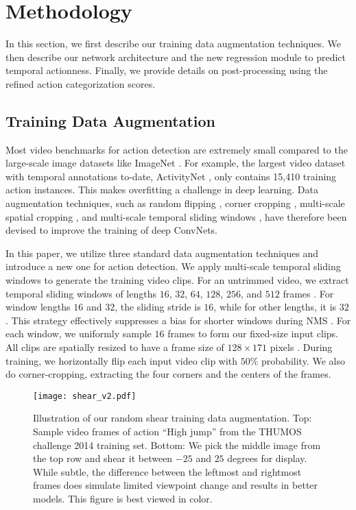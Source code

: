 \documentclass[10pt,twocolumn,letterpaper]{article}
\begin{document}
\section{Methodology}
\label{sec:methodology}
In this section, we first describe our training data augmentation techniques. We then describe our network architecture and the new regression module to predict temporal actionness. Finally, we provide details on post-processing using the refined action categorization scores.

\subsection{Training Data Augmentation}
Most video benchmarks for action detection are extremely small compared to the large-scale image datasets like ImageNet \cite{imagenet_cvpr09}. For example, the largest video dataset with temporal annotations to-date, ActivityNet \cite{activityNet}, only contains 15,410 training action instances. This makes overfitting a challenge in deep learning. Data augmentation techniques, such as random flipping \cite{imagenet_deep_learning_nips12_alex}, corner cropping \cite{wanggoodpractice2015}, multi-scale spatial cropping \cite{sppnet,twostream2014}, and multi-scale temporal sliding windows \cite{scnn_shou_wang_chang_cvpr16}, have therefore been devised to improve the training of deep ConvNets.

In this paper, we utilize three standard data augmentation techniques and introduce a new one for action detection.
We apply multi-scale temporal sliding windows to generate the training video clips. For an untrimmed video, we extract temporal sliding windows of lengths $16$, $32$, $64$, $128$, $256$, and $512$ frames \cite{scnn_shou_wang_chang_cvpr16}. For window lengths $16$ and $32$, the sliding stride is $16$, while for other lengths, it is $32$. This strategy effectively suppresses a bias for shorter windows during NMS \cite{compact_fisher_action_oneata_iccv13}. For each window, we uniformly sample $16$ frames to form our fixed-size input clips. All clips are spatially resized to have a frame size of $128 \times 171$ pixels \cite{c3d2015}.  
During training, we horizontally flip each input video clip with $50\%$ probability. We also do corner-cropping, extracting the four corners and the centers of the frames.

\begin{figure}[t]
	\centering
	\texttt{[image: shear\_v2.pdf]}
	\vspace{-20ex}
	\caption{Illustration of our random shear training data augmentation. Top: Sample video frames of action ``High jump'' from the THUMOS challenge 2014 training set.  Bottom: We pick the middle image from the top row and shear it between $-25$ and $25$ degrees for display. While subtle, the difference between the leftmost and rightmost frames does simulate limited viewpoint change and results in better models. This figure is best viewed in color. }
	\label{fig:shear}
	\vspace{-2ex}
\end{figure}
\end{document}
